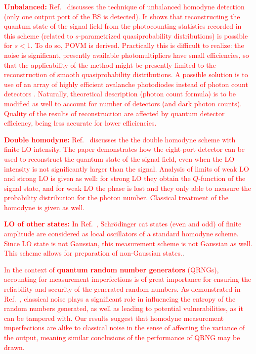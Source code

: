 \documentclass[%
reprint,
superscriptaddress,
 amsmath,amssymb,amsfonts,
 aps,
 pra,
 longbibliography
]{revtex4-2}
\begin{document}
\textcolor{red}{\textbf{Unbalanced:}
        Ref.~\cite{PhysRevA.53.4528} discusses the technique of
        unbalanced homodyne detection (only one output port of the BS
        is detected). It shows that reconstructing the quantum state
        of the signal field from the photocounting statistics recorded
        in this scheme (related to $s$-parametrized quasiprobability
        distributions) is possible for $s<1$. To do so, POVM is
        derived. 
        Practically this is difficult to realize: the noise is
        significant,  presently available photomultipliers have small
        efficiencies, so that the applicability of the method might be
        presently limited to the reconstruction of smooth
        quasiprobability distributions. A possible solution is to use
        of an array of highly efficient avalanche photodiodes instead
        of photon count detectors \cite{PhysRevA.53.4528,
          PhysRevA.101.031801}. Naturally, theoretical description
        (photon count formula) is to be modified as well
        \cite{PhysRevA.85.023820,PhysRevA.92.053835} to account for
        number of detectors (and dark photon counts).  
Quality of the results of reconstruction are affected by quantum
detector efficiency, being less accurate for lower efficiencies.} 

\textcolor{red}{
\textbf{Double homodyne:}
        Ref.~\cite{Cives_Esclop_2000} discusses the the double
        homodyne scheme with finite LO intensity. The paper
        demonstrates how the eight-port detector can be used to
        reconstruct the quantum state of the signal field, even when
        the LO intensity is not significantly larger than the
        signal. Analysis of limits of weak LO and strong LO is given
        as well: for strong LO they obtain the $Q$-function of the
        signal state, and for weak LO the phase is lost and they only
        able to measure the probability distribution for the photon
        number. Classical treatment of the homodyne is given as well. 
}

\textcolor{red}{\textbf{LO of other states:}
In Ref.~\cite{combes2022homodyne},  Schr\"odinger cat states (even and
odd) of finite amplitude are considered as local oscillators of a
standard homodyne scheme. Since LO state is not Gaussian, this
measurement scheme is not Gaussian as well. This scheme allows for
preparation of non-Gaussian states.}. 

\textcolor{red}{
In the context of \textbf{quantum random number generators} (QRNGs),
accounting for measurement imperfections is of great importance for
ensuring the reliability and security of the generated random
numbers. As demonstrated in Ref.~{\cite{haw2015maximization}},
classical noise plays a significant role in influencing the entropy of
the random numbers generated, as well as leading to potential
vulnerabilities, as it can be tampered with. Our results suggest that
homodyne measurement imperfections are alike to classical noise in the
sense of affecting the variance of the output, meaning similar
conclusions of the performance of QRNG may be drawn. 
}
\end{document}

